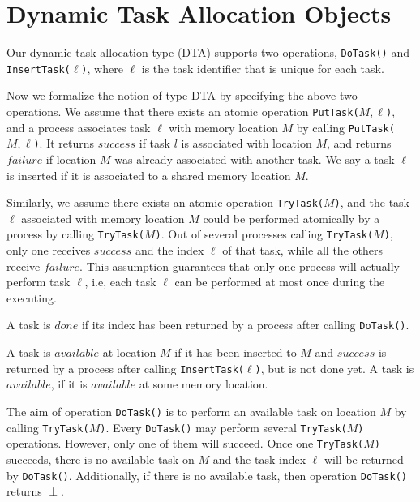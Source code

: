 \def\CTeXPreproc{Created by ctex v0.2.14, don't edit!}%
\chapter{Dynamic Task Allocation Objects}

Our dynamic task allocation type (DTA) supports two operations, \texttt{DoTask()} and \texttt{InsertTask(}$\ell$\texttt{)}, where $\ell$ is the task identifier that is unique for each task.

Now we formalize the notion of type DTA by specifying the above two operations. We assume that there exists an atomic operation \texttt{PutTask(}$M,\ell$\texttt{)}, and a process associates task $\ell$ with memory location $M$ by calling \texttt{PutTask(}$M,\ell$\texttt{)}. It returns $success$ if task $l$ is associated with location $M$, and returns $failure$ if location $M$ was already associated with another task. We say a task $\ell$ is inserted if it is associated to a shared memory location $M$.

Similarly, we assume there exists an atomic operation \texttt{TryTask(}$M$\texttt{)}, and the task $\ell$ associated with memory location $M$ could be performed atomically by a process by calling \texttt{TryTask(}$M$\texttt{)}. Out of several processes calling \texttt{TryTask(}$M$\texttt{)}, only one receives $success$ and the index $\ell$ of that task, while all the others receive $failure$. This assumption guarantees that only one process will actually perform task $\ell$, i.e, each task $\ell$ can be performed at most once during the executing.

A task is $done$ if its index has been returned by a process after calling \texttt{DoTask()}.

A task is $available$ at location $M$ if it has been inserted to $M$ and $success$ is returned by a process after calling \texttt{InsertTask(}$\ell$\texttt{)}, but is not done yet. A task is $available$, if it is $available$ at some memory location.

The aim of operation \texttt{DoTask()} is to perform an available task on location $M$ by calling \texttt{TryTask(}$M$\texttt{)}. Every \texttt{DoTask()} may perform several \texttt{TryTask(}$M$\texttt{)} operations. However, only one of them will succeed. Once one \texttt{TryTask(}$M$\texttt{)} succeeds, there is no available task on $M$ and the task index $\ell$ will be returned by \texttt{DoTask()}. Additionally, if there is no available task, then operation \texttt{DoTask()} returns $\perp$.

